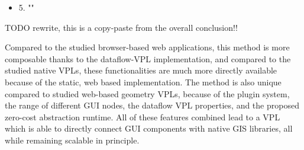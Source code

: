 \begin{itemize}[ ]
  \item 5. "\myNewSubRQFive"
\end{itemize}

\begin{note}
  TODO rewrite, this is a copy-paste from the overall conclusion!!
\end{note}

Compared to the studied browser-based web applications, this method is more composable thanks to the dataflow-VPL implementation, 
and compared to the studied native VPLs, these functionalities are much more directly available because of the static, web based implementation.
The method is also unique compared to studied web-based geometry VPLs, because of the plugin system, the range of different \ac{GUI} nodes, the dataflow VPL properties, and the proposed zero-cost abstraction runtime. 
All of these features combined lead to a VPL which is able to directly connect \ac{GUI} components with native \ac{GIS} libraries, all while remaining scalable in principle.










